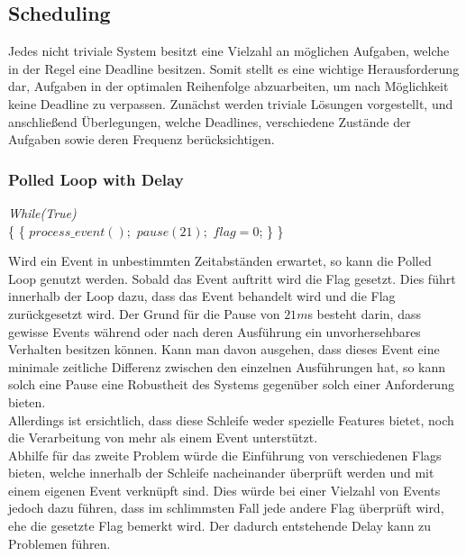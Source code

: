 \subsection{Scheduling}\label{2.6}
Jedes nicht triviale System besitzt eine Vielzahl an möglichen Aufgaben, welche in der Regel eine Deadline besitzen. Somit stellt es eine wichtige Herausforderung dar, Aufgaben in der optimalen Reihenfolge abzuarbeiten, um nach Möglichkeit keine Deadline zu verpassen. Zunächst werden triviale Lösungen vorgestellt, und anschließend Überlegungen, welche Deadlines, verschiedene Zustände der Aufgaben sowie deren Frequenz berücksichtigen.

\subsubsection{Polled Loop with Delay}

\begin{algorithm}
\label{sced1}
\begin{algorithmic}[1]

\BState \textit{While(True)}\\
\{
 \{
\State $process\_event();$
\State $pause(21);$
\State $flag=0$;
\}
\EndIf
\}

\end{algorithmic}
\end{algorithm}

Wird ein Event in unbestimmten Zeitabständen erwartet, so kann die Polled Loop genutzt werden. Sobald das Event auftritt wird die Flag gesetzt. Dies führt innerhalb der Loop dazu, dass das Event behandelt wird und die Flag zurückgesetzt wird. Der Grund für die Pause von $21m$s besteht darin, dass gewisse Events während oder nach deren Ausführung ein unvorhersehbares Verhalten besitzen können. Kann man davon ausgehen, dass dieses Event eine minimale zeitliche Differenz zwischen den einzelnen Ausführungen hat, so kann solch eine Pause eine Robustheit des Systems gegenüber solch einer Anforderung bieten.\\
Allerdings ist ersichtlich, dass diese Schleife weder spezielle Features bietet, noch die Verarbeitung von mehr als einem Event unterstützt.\\
Abhilfe für das zweite Problem würde die Einführung von verschiedenen Flags bieten, welche innerhalb der Schleife nacheinander überprüft werden und mit einem eigenen Event verknüpft sind. Dies würde bei einer Vielzahl von Events jedoch dazu führen, dass im schlimmsten Fall jede andere Flag überprüft wird, ehe die gesetzte Flag bemerkt wird. Der dadurch entstehende Delay kann zu Problemen führen.

